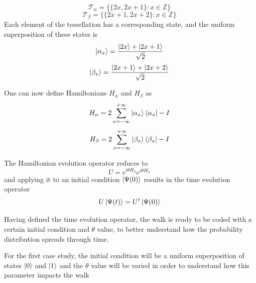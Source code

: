 \documentclass[../../dissertation.tex]{subfiles}
\begin{document}
\begin{equation}
	\mathscr{T}_{\alpha}= \{\{2x,2x+1\}\colon x \in \mathbb{Z}\}
\end{equation}
\begin{equation}
	\mathscr{T}_{\beta}= \{\{2x+1,2x+2\}\colon x \in \mathbb{Z}\}
\end{equation}
Each element of the tessellation has a corresponding state, and the uniform superposition of these states is
\begin{equation}
	\ket{\alpha_x} = \frac{\ket{2x} + \ket{2x+1}}{\sqrt{2}}
\end{equation}
\begin{equation}
	\ket{\beta_x} = \frac{\ket{2x+1}+\ket{2x+2}}{\sqrt{2}}
\end{equation}\par
One can now define Hamiltonians $H_\alpha$ and $H_\beta$ as 
\begin{equation}
	H_\alpha = 2\sum_{x=-\infty}^{+\infty}\ket{\alpha_{x}}\bra{\alpha_x} - I
	\label{eq:stagSimulHalpha}
\end{equation}
\begin{equation}
	H_\beta = 2\sum_{x=-\infty}^{+\infty}\ket{\beta_{x}}\bra{\beta_x} - I
	\label{eq:stagSimulHbeta}
\end{equation}\par
The Hamiltonian evolution operator reduces to
\begin{equation}
	U = e^{i\theta H_\beta}e^{i\theta H_\alpha}
	\label{eq:stagSimulUniOp}
\end{equation}
and applying it to an initial condition $\ket{\Psi(0)}$ results in the time evolution operator
\begin{equation}
	U\ket{\Psi(t)} = U^t\ket{\Psi(0)}
\end{equation}\par
Having defined the time evolution operator, the walk is ready to be coded with a certain initial condition and $\theta$ value, to better understand how the probability distribution spreads through time. 

For the first case study, the initial condition will be a uniform superposition of states $\ket{0}$ and $\ket{1}$ and the $\theta$ value will be varied in order to understand how this parameter impacts the walk
\end{document}

